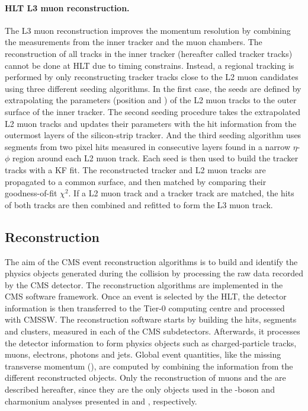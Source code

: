 \paragraph{HLT L3 muon reconstruction.} The L3 muon reconstruction improves the momentum resolution by combining the measurements from the inner tracker and the muon chambers. The reconstruction of all tracks in the inner tracker (hereafter called tracker tracks) cannot be done at HLT due to timing constrains. Instead, a regional tracking is performed by only reconstructing tracker tracks close to the L2 muon candidates using three different seeding algorithms. In the first case, the seeds are defined by extrapolating the parameters (position and \pt) of the L2 muon tracks to the outer surface of the inner tracker. The second seeding procedure takes the extrapolated L2 muon tracks and updates their parameters with the hit information from the outermost layers of the silicon-strip tracker. And the third seeding algorithm uses segments from two pixel hits measured in consecutive layers found in a narrow $\eta$-$\phi$ region around each L2 muon track. Each seed is then used to build the tracker tracks with a KF fit. The reconstructed tracker and L2 muon tracks are propagated to a common surface, and then matched by comparing their goodness-of-fit $\chi^{2}$. If a L2 muon track and a tracker track are matched, the hits of both tracks are then combined and refitted to form the L3 muon track.


\subsection{Reconstruction}\label{sec:Experiment_CMS_Reconstruction}

The aim of the CMS event reconstruction algorithms is to build and identify the physics objects generated during the collision by processing the raw data recorded by the CMS detector. The reconstruction algorithms are implemented in the CMS software framework. Once an event is selected by the HLT, the detector information is then transferred to the Tier-0 computing centre and processed with CMSSW. The reconstruction software starts by building the hits, segments and clusters, measured in each of the CMS subdetectors. Afterwards, it processes the detector information to form physics objects such as charged-particle tracks, muons, electrons, photons and jets. Global event quantities, like the missing transverse momentum (\ptmiss), are computed by combining the information from the different reconstructed objects. Only the reconstruction of muons and the \ptmiss are described hereafter, since they are the only objects used in the \Wb-boson and charmonium analyses presented in  and , respectively.


